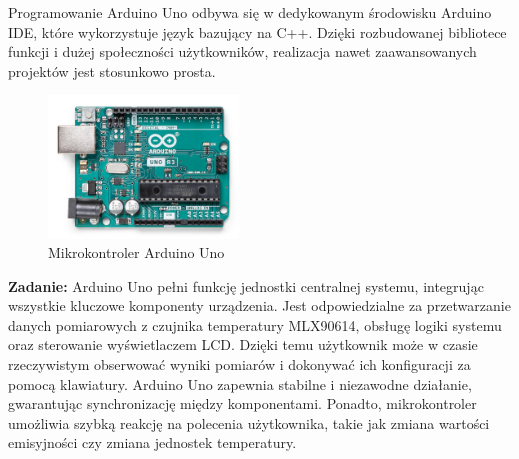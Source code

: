     \vspace{12pt}

    Programowanie Arduino Uno odbywa się w dedykowanym środowisku Arduino IDE, które wykorzystuje język bazujący na C++. Dzięki rozbudowanej bibliotece funkcji i dużej społeczności użytkowników, realizacja nawet zaawansowanych projektów jest stosunkowo prosta.

    \vspace{12pt}

    \begin{figure}[h!]
        \centering
        \includegraphics[width=0.45\textwidth]{images/uno.jpg}
        \caption{Mikrokontroler Arduino Uno \cite{5}}
        \label{fig:uno}
    \end{figure}

    \vspace{12pt}

\textbf{Zadanie:} Arduino Uno pełni funkcję jednostki centralnej systemu, integrując wszystkie kluczowe komponenty urządzenia. Jest odpowiedzialne za przetwarzanie danych pomiarowych z czujnika temperatury MLX90614, obsługę logiki systemu oraz sterowanie wyświetlaczem LCD. Dzięki temu użytkownik może w czasie rzeczywistym obserwować wyniki pomiarów i dokonywać ich konfiguracji za pomocą klawiatury. Arduino Uno zapewnia stabilne i niezawodne działanie, gwarantując synchronizację między komponentami. Ponadto, mikrokontroler umożliwia szybką reakcję na polecenia użytkownika, takie jak zmiana wartości emisyjności czy zmiana jednostek temperatury.


\vspace{12pt}


